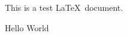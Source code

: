 \documentclass{article}
\begin{document}
This is a test \LaTeX\ document.

Hello World
\end{document}
